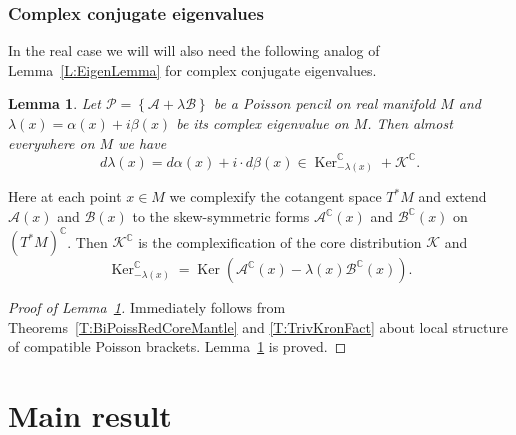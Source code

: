 \documentclass[12pt]{article}
\newtheorem{lemma}{Lemma}[section]
\theoremstyle{definition}
\begin{document}
\subsubsection{Complex conjugate eigenvalues}

In the real case we will  will also need the following analog of Lemma~\ref{L:EigenLemma} for complex conjugate eigenvalues. 

\begin{lemma} \label{L:EigenLemmaRealConj} Let $\mathcal{P} = \left\{\mathcal{A} + \lambda \mathcal{B} \right\}$ be a Poisson pencil on real manifold $M$ and $\lambda(x) = \alpha(x) + i \beta(x)$ be its complex eigenvalue on $M$. Then almost everywhere on $M$  we have \begin{equation} \label{Eq:DLambdaMainRealConj} d\lambda(x) = d\alpha(x) + i \cdot d \beta(x) \in \operatorname{Ker}_{-\lambda(x)}^{\mathbb{C}} + \mathcal{K}^{\mathbb{C}}.  \end{equation} 
\end{lemma}

Here at each point $x \in M$ we complexify the cotangent space $T^* M$ and extend $\mathcal{A}(x)$ and $\mathcal{B}(x)$ to the skew-symmetric forms $\mathcal{A}^{\mathbb{C}} (x)$ and $\mathcal{B}^{\mathbb{C}} (x)$ on $(T^*M)^{\mathbb{C}}$. Then $\mathcal{K}^{\mathbb{C}}$ is the complexification of the core distribution $\mathcal{K}$ and  \[\operatorname{Ker}_{-\lambda(x)}^{\mathbb{C}} = \operatorname{Ker}\left(\mathcal{A}^{\mathbb{C}}(x) - \lambda(x) \mathcal{B}^{\mathbb{C}}(x)\right). \]

\begin{proof}[Proof of Lemma~\ref{L:EigenLemmaRealConj}]
Immediately follows from Theorems~\ref{T:BiPoissRedCoreMantle} and \ref{T:TrivKronFact} about local structure of compatible Poisson brackets. Lemma~\ref{L:EigenLemmaRealConj} is proved. 
\end{proof}


\section{Main result}
\end{document}
